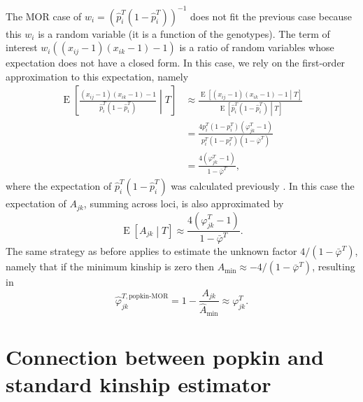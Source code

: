 \documentclass[9pt,twocolumn,twoside]{gsajnl}
\newcommand{\xij}[1][j]{x_{i#1}}
\newcommand{\pit}{p_i^T}
\newcommand{\pith}{\hat{p}_i^T}
\newcommand{\kt}[1][k]{\varphi_{j#1}^T}
\newcommand{\ktHatNamed}[2][k]{\hat{\varphi}_{j#1}^{T,\text{#2}}}
\newcommand{\Ajk}[1][k]{A_{j#1}}
\newcommand{\AMinHat}{\hat{A}_{\text{min}}}
\DeclareMathOperator{\E}{E}
\begin{document}
\begin{appendices}
  The MOR case of $w_i = \left( \pith \left( 1 - \pith \right) \right)^{-1}$ does not fit the previous case because this $w_i$ is a random variable (it is a function of the genotypes).
  The term of interest $w_i ( (\xij-1)(\xij[k]-1) - 1 )$ is a ratio of random variables whose expectation does not have a closed form.
  In this case, we rely on the first-order approximation to this expectation, namely
  \begin{align*}
    \E \left[ \frac{ (\xij-1)(\xij[k]-1) - 1 }{ \pith \left( 1 - \pith \right) } \middle| T \right]
    &\approx
      \frac{ \E \left[ (\xij-1)(\xij[k]-1) - 1 \middle| T \right] }{ \E \left[ \pith \left( 1 - \pith \right) \middle| T \right] }
    \\
    &=
      \frac{ 4 \pit \left( 1 - \pit \right) \left( \kt - 1 \right) }{ \pit \left( 1 - \pit \right) \left( 1 - \bar{\varphi}^T \right) }
    \\
    &=
      \frac{ 4 \left( \kt - 1 \right) }{ 1 - \bar{\varphi}^T }
  ,
  \end{align*}
  where the expectation of $\pith \left( 1 - \pith \right)$ was calculated previously \citep{ochoa_estimating_2021}.
  In this case the expectation of $\Ajk$, summing across loci, is also approximated by
  $$
  \E \left[ \Ajk \middle| T \right]
  \approx
  \frac{ 4 \left( \kt - 1 \right) }{ 1 - \bar{\varphi}^T }
  .
  $$
  The same strategy as before applies to estimate the unknown factor $4 / \left( 1- \bar{\varphi}^T \right)$, namely that if the minimum kinship is zero then $\AMinHat \approx - 4 / \left( 1- \bar{\varphi}^T \right)$, resulting in
  $$
  \ktHatNamed{popkin-MOR}
  =
  1 - \frac{\Ajk}{\AMinHat}
  \approx
  \kt
  .
  $$

  \section{Connection between popkin and standard kinship estimator}

  \label{sec:conn_popkin_std}  


\end{appendices}
\end{document}
